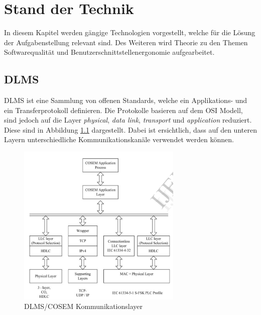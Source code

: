 \chapter{Stand der Technik}
In diesem Kapitel werden gängige Technologien vorgestellt, welche für die Lösung der Aufgabenstellung relevant sind.
Des Weiteren wird Theorie zu den Themen Softwarequalität und Benutzerschnittstellenergonomie aufgearbeitet.


\section{DLMS}
\ac{DLMS} ist eine Sammlung von offenen Standards, welche ein Applikations- und ein Transferprotokoll definieren.
Die Protokolle basieren auf dem \ac{OSI} Modell, sind jedoch auf die Layer \textit{physical}, \textit{data link}, \textit{transport} und \textit{application} reduziert.
Diese sind in Abbildung \ref{fig:dlmsOsi} dargestellt.
Dabei ist ersichtlich, dass auf den unteren Layern unterschiedliche Kommunikationskanäle verwendet werden können.

\begin{figure}[H]
   \centering
   \includegraphics[width=0.7\textwidth]{gfx/Dlms_osi.png}
   \caption{
       DLMS/COSEM Kommunikationslayer
   }
   \label{fig:dlmsOsi}
\end{figure}

